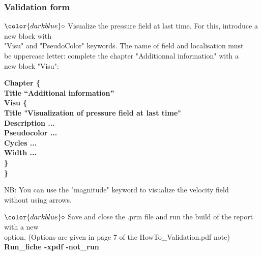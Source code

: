 \documentclass[10pt]{beamer}
\begin{document}
\begin{frame}
\frametitle{Validation form}
\begin{block}{}

\hspace{1cm} $\color{darkblue}\circ$ {\small{Visualize the pressure field at last time. For this, introduce a new block with \\
\hspace{1.3cm} "Visu" and "PseudoColor" keywords. The name of field and localisation must \\
\hspace{1.3cm} be uppercase letter: complete the chapter "Additionnal information" with a \\
\hspace{1.3cm} new block "Visu":}}

{\footnotesize{
\hspace{1.5cm} \textbf{Chapter \{ } \\
\hspace{1.8cm} \textbf{Title “Additional information”} \\
\hspace{1.8cm} \textbf{Visu \{ } \\
\hspace{2cm} \textbf{Title "Visualization of pressure field at last time" } \\
\hspace{2cm} \textbf{Description ...} \\
\hspace{2cm} \textbf{Pseudocolor ...} \\
\hspace{2cm} \textbf{Cycles ...} \\
\hspace{2cm} \textbf{Width ...} \\
\hspace{1.8cm} \textbf{\}} \\
\hspace{1.5cm} \textbf{\}} \\
}}

\hspace{1.3cm} NB: You can use the "magnitude" keyword to visualize the velocity field \\
\hspace{1.3cm} without using arrows.

\hspace{1cm} $\color{darkblue}\circ$ {\small{ Save and close the .prm file and run the build of the report with a new \\
\hspace{1.3cm} option. (Options are given in page 7 of the HowTo\_Validation.pdf note) }}\\
\hspace{1.3cm} {\small{\textbf{Run\_fiche -xpdf -not\_run}}}

\end{block}
\end{frame}
\end{document}
